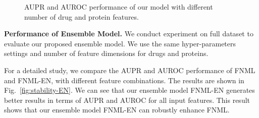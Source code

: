\documentclass[journal]{IEEEtran}
\begin{document}
\begin{figure}[!ht]
\centering
{}
\caption{AUPR and AUROC performance of our model with different number of drug and protein features.}\label{fig:parameter}
\end{figure}

\textbf{Performance of Ensemble Model.} 
We conduct experiment on full dataset to evaluate our proposed ensemble model. We use the same hyper-parameters settings and number of feature dimensions for drugs and proteins.

For a detailed study, we compare the AUPR and AUROC performance of FNML and FNML-EN, with different feature combinations. The results are shown in Fig.~\ref{fig:stability-EN}. We can see that our ensemble model FNML-EN generates better results in terms of AUPR and AUROC for all input features. This result shows that our ensemble model FNML-EN can robustly enhance FNML.
\end{document}
